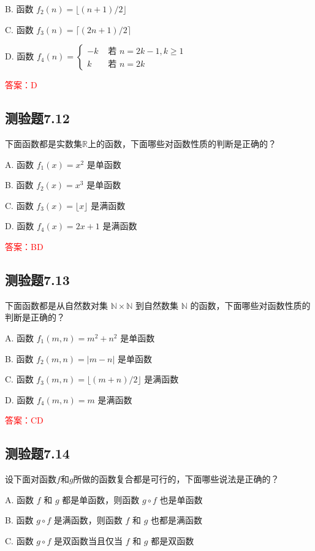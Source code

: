 \documentclass[UTF8, heading=true]{ctexart}
\begin{document}
B. 函数 $f_2(n)=\lfloor(n+1) / 2\rfloor$

C. 函数 $f_3(n)=\lceil(2 n+1) / 2\rceil$

D. 函数 $f_4(n)= \begin{cases}-k & \text { 若 } n=2 k-1, k \geq 1 \\ k & \text { 若 } n=2 k\end{cases}$

\textcolor{red}{答案：D}

\subsection{测验题7.12}

下面函数都是实数集$\mathbb{R}$上的函数，下面哪些对函数性质的判断是正确的？

A. 函数 $f_1(x)=x^2$ 是单函数

B. 函数 $f_2(x)=x^3$ 是单函数

C. 函数 $f_3(x)=\lfloor x\rfloor$ 是满函数

D. 函数 $f_4(x)=2 x+1$ 是满函数

\textcolor{red}{答案：BD}

\subsection{测验题7.13}

下面函数都是从自然数对集 $\mathbb{N} \times \mathbb{N}$ 到自然数集 $\mathbb{N}$ 的函数，下面哪些对函数性质的判断是正确的？

A. 函数 $f_1(m, n)=m^2+n^2$ 是单函数

B. 函数 $f_2(m, n)=|m-n|$ 是单函数

C. 函数 $f_3(m, n)=\lfloor(m+n) / 2\rfloor$ 是满函数

D. 函数 $f_4(m, n)=m$ 是满函数

\textcolor{red}{答案：CD}

\subsection{测验题7.14}

设下面对函数$f$和$g$所做的函数复合都是可行的，下面哪些说法是正确的？

A. 函数 $f$ 和 $g$ 都是单函数，则函数 $g \circ f$ 也是单函数

B. 函数 $g \circ f$ 是满函数，则函数 $f$ 和 $g$ 也都是满函数

C. 函数 $g \circ f$ 是双函数当且仅当 $f$ 和 $g$ 都是双函数
\end{document}
